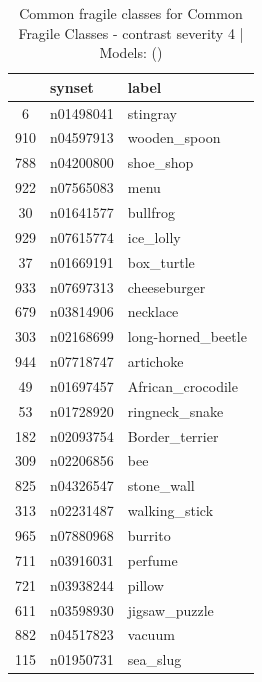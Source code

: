 \begin{table}
\caption{Common fragile classes for Common Fragile Classes - contrast severity 4 | Models: ()}
\label{tab:Common Fragile Classes - contrast severity 4_d41d8cd9}
\begin{tabular}{cll}
\toprule
 & synset & label \\
\midrule
6 & n01498041 & stingray \\
910 & n04597913 & wooden_spoon \\
788 & n04200800 & shoe_shop \\
922 & n07565083 & menu \\
30 & n01641577 & bullfrog \\
929 & n07615774 & ice_lolly \\
37 & n01669191 & box_turtle \\
933 & n07697313 & cheeseburger \\
679 & n03814906 & necklace \\
303 & n02168699 & long-horned_beetle \\
944 & n07718747 & artichoke \\
49 & n01697457 & African_crocodile \\
53 & n01728920 & ringneck_snake \\
182 & n02093754 & Border_terrier \\
309 & n02206856 & bee \\
825 & n04326547 & stone_wall \\
313 & n02231487 & walking_stick \\
965 & n07880968 & burrito \\
711 & n03916031 & perfume \\
721 & n03938244 & pillow \\
611 & n03598930 & jigsaw_puzzle \\
882 & n04517823 & vacuum \\
115 & n01950731 & sea_slug \\
\bottomrule
\end{tabular}
\end{table}
